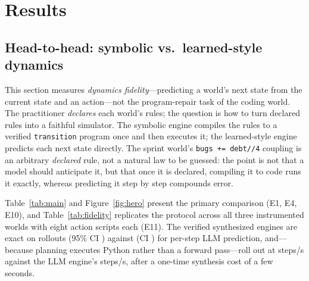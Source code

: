 \documentclass[11pt]{article}
\begin{document}
\section{Results}\label{sec:results}

\subsection{Head-to-head: symbolic vs.\ learned-style dynamics}
This section measures \emph{dynamics fidelity}---predicting a world's next state
from the current state and an action---not the program-repair task of the coding
world. The practitioner \emph{declares} each world's rules; the question is how
to turn declared rules into a faithful simulator. The symbolic engine compiles
the rules to a verified \texttt{transition} program once and then executes it;
the learned-style engine predicts each next state directly. The sprint world's
\texttt{bugs\,{+}{=}\,debt//4} coupling is an arbitrary \emph{declared} rule, not
a natural law to be guessed: the point is not that a model should anticipate it,
but that once it is declared, compiling it to code runs it exactly, whereas
predicting it step by step compounds error.

Table~\ref{tab:main} and Figure~\ref{fig:hero} present the primary comparison
(E1, E4, E10), and Table~\ref{tab:fidelity} replicates the protocol across
all three instrumented worlds with eight action scripts each (E11). The
verified synthesized engines are exact on \MultiCodeExact{} rollouts (95\%
CI \MultiCodeCI) against \MultiLLMExact{} (CI \MultiLLMCI) for per-step LLM
prediction, and---because planning executes Python rather than a forward
pass---roll out at \CodeStepsPerSec{} steps/s against the LLM engine's
\LLMStepsPerSec{} steps/s, after a one-time synthesis cost of a few seconds.

\begin{table}[htb]\centering\small

\caption{Head-to-head engine comparison on the sprint world (E1, E4, E10):
mean first-divergence step and final $L^1$ error over three
\RolloutSteps-step rollouts against a ground-truth oracle; exact transition
accuracy on ten $10\times$ out-of-distribution probes; and rollout
throughput. A first divergence of \CodeFirstDivergence{} means no divergence
occurred within the rollout.}
\label{tab:main}
\end{table}

\begin{table}[htb]\centering\small

\caption{Multi-world replication (E11): exact \RolloutSteps-step rollouts per
world, eight scripts each, dynamics synthesized once per world by the 7B
generator. Totals carry 95\% Wilson CIs.}
\label{tab:fidelity}
\end{table}
\end{document}
